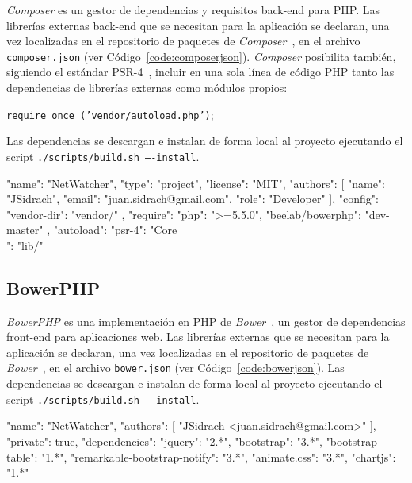 \textit{Composer} es un gestor de dependencias y requisitos \gls{back-end} para \gls{PHP}.
Las librerías externas \gls{back-end} que se necesitan para la aplicación se declaran, una vez localizadas en el repositorio de paquetes de \textit{Composer}~\cite{composerrepositorio}, en el archivo \texttt{composer.json} (ver Código~\ref{code:composerjson}).
\textit{Composer} posibilita también, siguiendo el estándar PSR-4~\cite{psr4}, incluir en una sola línea de código \gls{PHP} tanto las dependencias de librerías externas como módulos propios:

\texttt{require\_once ('vendor/autoload.php')};

Las dependencias se descargan e instalan de forma local al proyecto ejecutando el \gls{script} \texttt{./scripts/build.sh ----install}.

\begin{code}[label=code:composerjson,language=json,caption=Ejemplo de fichero \textit{composer.json}]
{
  "name": "NetWatcher",
  "type": "project",
  "license": "MIT",
  "authors": [
    {
      "name": "JSidrach",
      "email": "juan.sidrach@gmail.com",
      "role": "Developer"
    }
  ],
  "config": {
    "vendor-dir": "vendor/"
   },
  "require": {
    "php": ">=5.5.0",
    "beelab/bowerphp": "dev-master"
  },
  "autoload": {
    "psr-4": {
      "Core\\": "lib/"
    }
  }
}
\end{code}

\subsection*{BowerPHP\label{extra:mvc:bowerphp}}

\textit{BowerPHP} es una implementación en \gls{PHP} de \textit{Bower}~\cite{bower}, un gestor de dependencias \gls{front-end} para aplicaciones web.
Las librerías externas que se necesitan para la aplicación se declaran, una vez localizadas en el repositorio de paquetes de \textit{Bower}~\cite{bowerrepositorio}, en el archivo \texttt{bower.json} (ver Código~\ref{code:bowerjson}).
Las dependencias se descargan e instalan de forma local al proyecto ejecutando el \gls{script} \texttt{./scripts/build.sh ----install}.

\begin{code}[label=code:bowerjson,language=json,caption=Ejemplo de fichero \textit{bower.json}]
{
  "name": "NetWatcher",
  "authors": [
    "JSidrach <juan.sidrach@gmail.com>"
  ],
  "private": true,
  "dependencies": {
    "jquery": "2.*",
    "bootstrap": "3.*",
    "bootstrap-table": "1.*",
    "remarkable-bootstrap-notify": "3.*",
    "animate.css": "3.*",
    "chartjs": "1.*"
  }
}
\end{code}

